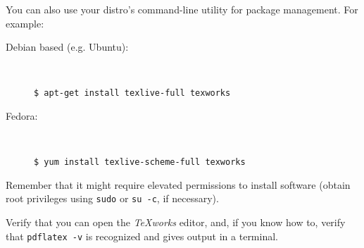 \documentclass[a4paper, 12pt]{article}
\begin{document}
You can also use your distro's command-line utility for package management. For example:
\begin{description}
	\item[Debian based (e.g. Ubuntu):] \hfill \\ 
\begin{lstlisting}
$ apt-get install texlive-full texworks
\end{lstlisting}
	
	\item[Fedora:] \hfill \\
\begin{lstlisting}
$ yum install texlive-scheme-full texworks
\end{lstlisting}	
\end{description}
Remember that it might require elevated permissions to install software (obtain root privileges using \lstinline|sudo| or \lstinline|su -c|, if necessary).

Verify that you can open the \emph{TeXworks} editor, and, if you know how to, verify that \lstinline|pdflatex -v| is recognized and gives output in a terminal.
\end{document}
